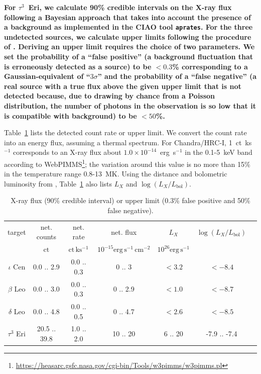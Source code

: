 \documentclass[preprint2]{aastex631}
\begin{document}
\textbf{For $\tau^3$~Eri, we calculate 90\% credible intervals on the X-ray flux following a Bayesian approach that
takes into account the presence of a background \citep{2014ApJ...796...24P} as implemented in the CIAO tool \texttt{aprates}. For the three undetected sources, we calculate upper limits following the procedure of \citet{2010ApJ...719..900K}. Deriving an upper limit requires the choice of two parameters. We set the probability of a ``false positive'' (a background fluctuation that is erroneously detected as a source) to be $<0.3$\% corresponding to a
Gaussian-equivalent of ``$3\sigma$'' and the probability of a ``false negative'' (a real source with a true flux above the given upper limit that is not detected because, due to drawing by chance from a Poisson distribution,  the number of photons in the observation is so low that it is compatible with background) to be $<50$\%.}


Table~\ref{tab:detections} lists the detected count rate or upper limit. We convert the count rate into an energy flux, assuming a thermal spectrum. For Chandra/HRC-I,
1~ct~ks$^{-1}$ corresponds to an X-ray flux about $1.0\times10^{-14}$~erg~s$^{-1}$ in the 0.1-5~keV band according to WebPIMMS\footnote{\url{https://heasarc.gsfc.nasa.gov/cgi-bin/Tools/w3pimms/w3pimms.pl}}; the variation around this value is no more than 15\% in the temperature range 0.8-13~MK. Using the distance and bolometric luminosity from \citet{2002ApJ...579..800S}, Table~\ref{tab:detections} also lists $L_X$ and $\log(L_X/L_\mathrm{bol})$.
\begin{table}
\caption{X-ray flux (90\% credible interval) or upper limit (0.3\% false positive and 50\% false negative).\label{tab:detections}}
\begin{tabular}{ccccccc}
  \hline \hline
target & net. counts & net. rate & net. flux & $L_X$ & $\log(L_X/L_\mathrm{bol})$\\
 & $\mathrm{ct}$ & $\mathrm{ct\,ks^{-1}}$ & $10^{-15}\mathrm{erg\,s^{-1}\,cm^{-2}}$ & $10^{26}\mathrm{erg\,s^{-1}}$ \\
\hline
$\iota$ Cen & 0.0 ..  2.9 & 0.0 ..  0.3 & 0 ..   3 &  $<3.2$ & $<-8.4$ \\
$\beta$ Leo & 0.0 ..  3.0 & 0.0 ..  0.3 & 0 .. 2.9 &  $<1.0$ & $<-8.7$ \\
$\delta$ Leo & 0.0 ..  4.8 & 0.0 ..  0.5 & 0 .. 4.7 &  $<2.6$ & $<-8.5$ \\
$\tau^3$ Eri & 20.5 .. 39.8 & 1.0 ..  2.0 & 10 ..   20 & 6 .. 20 & -7.9 .. -7.4 \\
\hline
\end{tabular}
\end{table}
\end{document}
